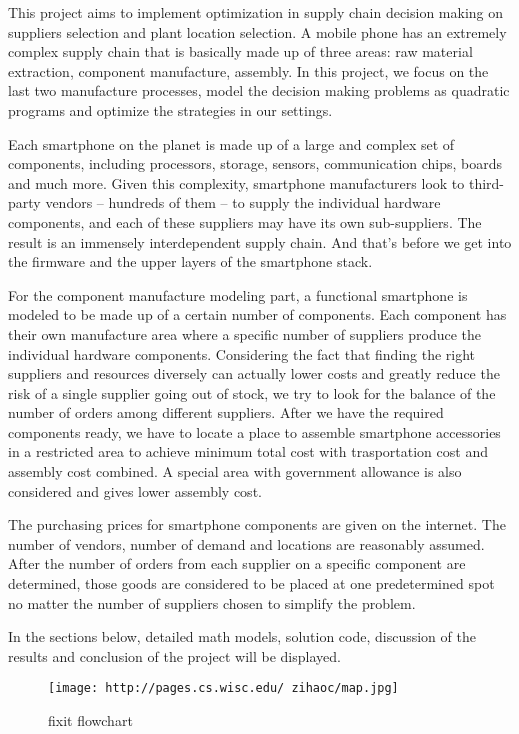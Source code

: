\documentclass[11pt]{article}
\makeatletter
\def\maxwidth{\ifdim\Gin@nat@width>\linewidth\linewidth
    \else\Gin@nat@width\fi}
\let\Oldincludegraphics\includegraphics
\renewcommand{\includegraphics}[1]{\Oldincludegraphics[width=.8\maxwidth]{#1}}
\makeatother
\begin{document}
This project aims to implement optimization in supply chain decision
making on suppliers selection and plant location selection. A mobile
phone has an extremely complex supply chain that is basically made up of
three areas: raw material extraction, component manufacture, assembly.
In this project, we focus on the last two manufacture processes, model
the decision making problems as quadratic programs and optimize the
strategies in our settings.

Each smartphone on the planet is made up of a large and complex set of
components, including processors, storage, sensors, communication chips,
boards and much more. Given this complexity, smartphone manufacturers
look to third-party vendors -- hundreds of them -- to supply the
individual hardware components, and each of these suppliers may have its
own sub-suppliers. The result is an immensely interdependent supply
chain. And that's before we get into the firmware and the upper layers
of the smartphone stack.

For the component manufacture modeling part, a functional smartphone is
modeled to be made up of a certain number of components. Each component
has their own manufacture area where a specific number of suppliers
produce the individual hardware components. Considering the fact that
finding the right suppliers and resources diversely can actually lower
costs and greatly reduce the risk of a single supplier going out of
stock, we try to look for the balance of the number of orders among
different suppliers. After we have the required components ready, we
have to locate a place to assemble smartphone accessories in a
restricted area to achieve minimum total cost with trasportation cost
and assembly cost combined. A special area with government allowance is
also considered and gives lower assembly cost.

The purchasing prices for smartphone components are given on the
internet. The number of vendors, number of demand and locations are
reasonably assumed. After the number of orders from each supplier on a
specific component are determined, those goods are considered to be
placed at one predetermined spot no matter the number of suppliers
chosen to simplify the problem.

In the sections below, detailed math models, solution code, discussion
of the results and conclusion of the project will be displayed.

\begin{figure}
\centering
\texttt{[image: http://pages.cs.wisc.edu/~zihaoc/map.jpg]}
\caption{fixit flowchart}
\end{figure}
\end{document}
